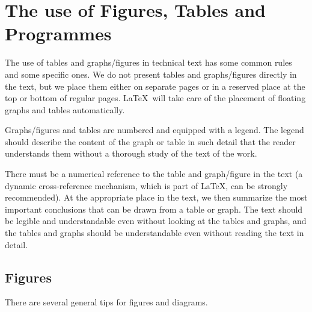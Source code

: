 \chapter{The use of Figures, Tables and Programmes}

The use of tables and graphs/figures in technical text has some common rules and 
some specific ones. We do not present tables and graphs/figures directly in the 
text, but we place them either on separate pages or in a reserved place at the 
top or bottom of regular pages. \LaTeX\ will take care of the placement of 
floating graphs and tables automatically.

Graphs/figures and tables are numbered and equipped with a legend. The legend 
should describe the content of the graph or table in such detail that the reader 
understands them without a thorough study of the text of the work.

There must be a numerical reference to the table and graph/figure in the text (a 
dynamic cross-reference mechanism, which is part of \LaTeX, can be strongly 
recommended). At the appropriate place in the text, we then summarize the most 
important conclusions that can be drawn from a table or graph. The text should 
be legible and understandable even without looking at the tables and graphs, and 
the tables and graphs should be understandable even without reading the text in 
detail.


\section{Figures}

There are several general tips for figures and diagrams.

